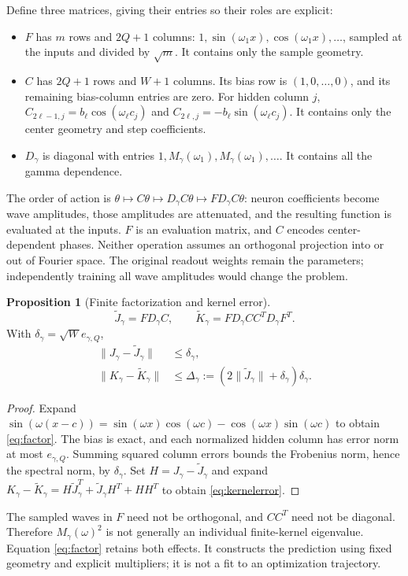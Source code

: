 \documentclass[11pt]{article}
\theoremstyle{definition}
\newtheorem{proposition}{Proposition}
\begin{document}
Define three matrices, giving their entries so their roles are explicit:
\begin{itemize}
\item $F$ has $m$ rows and $2Q+1$ columns:
$1,\sin(\omega_1x),\cos(\omega_1x),\ldots$, sampled at the inputs and divided
by $\sqrt m$. It contains only the sample geometry.
\item $C$ has $2Q+1$ rows and $W+1$ columns. Its bias row is
$(1,0,\ldots,0)$, and its remaining bias-column entries are zero. For hidden
column $j$, $C_{2\ell-1,j}=b_\ell\cos(\omega_\ell c_j)$ and
$C_{2\ell,j}=-b_\ell\sin(\omega_\ell c_j)$. It contains only the center
geometry and step coefficients.
\item $D_\gamma$ is diagonal with entries
$1,M_\gamma(\omega_1),M_\gamma(\omega_1),\ldots$.
It contains all the gamma dependence.
\end{itemize}
The order of action is
$\theta\mapsto C\theta\mapsto D_\gamma C\theta\mapsto FD_\gamma C\theta$:
neuron coefficients become wave amplitudes, those amplitudes are attenuated,
and the resulting function is evaluated at the inputs. $F$ is an evaluation
matrix, and $C$ encodes center-dependent phases. Neither operation assumes an
orthogonal projection into or out of Fourier space. The original readout
weights remain the parameters; independently training all wave amplitudes
would change the problem.

\begin{proposition}[Finite factorization and kernel error]
\begin{equation}\label{eq:factor}
 \widetilde J_\gamma=FD_\gamma C,\qquad
 \widetilde K_\gamma=FD_\gamma CC^TD_\gamma F^T.
\end{equation}
With $\delta_\gamma=\sqrt W e_{\gamma,Q}$,
\begin{equation}\label{eq:kernelerror}
 \begin{split}
 \|J_\gamma-\widetilde J_\gamma\|&\le\delta_\gamma,\\
 \|K_\gamma-\widetilde K_\gamma\|&\le
 \Delta_\gamma:=(2\|\widetilde J_\gamma\|+\delta_\gamma)\delta_\gamma.
 \end{split}
\end{equation}
\end{proposition}
\begin{proof}
Expand $\sin(\omega(x-c))=\sin(\omega x)\cos(\omega c)-\cos(\omega x)\sin(\omega c)$
to obtain \eqref{eq:factor}. The bias is exact, and each normalized hidden
column has error norm at most $e_{\gamma,Q}$. Summing squared column errors
bounds the Frobenius norm, hence the spectral norm, by $\delta_\gamma$.
Set $H=J_\gamma-\widetilde J_\gamma$ and expand
$K_\gamma-\widetilde K_\gamma=H\widetilde J_\gamma^T+\widetilde J_\gamma H^T+HH^T$
to obtain \eqref{eq:kernelerror}.
\end{proof}
The sampled waves in $F$ need not be orthogonal, and $CC^T$ need not be
diagonal. Therefore $M_\gamma(\omega)^2$ is not generally an individual
finite-kernel eigenvalue. Equation \eqref{eq:factor} retains both effects.
It constructs the prediction using fixed geometry and explicit multipliers;
it is not a fit to an optimization trajectory.
\end{document}
